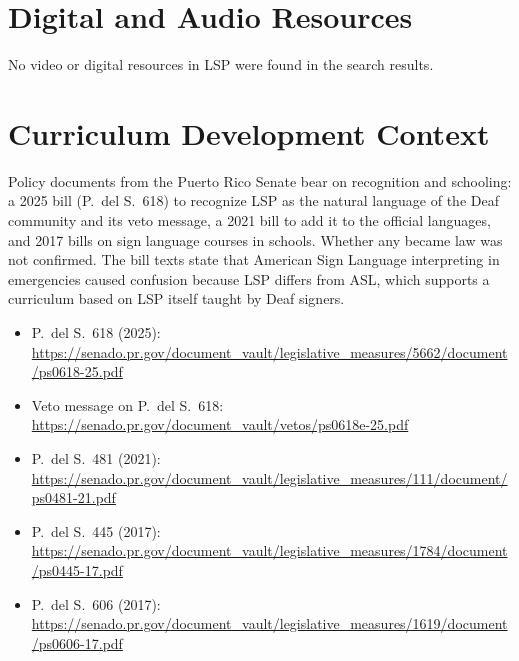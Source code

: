 \documentclass[12pt]{article}
\begin{document}
\section{Digital and Audio Resources}
No video or digital resources in LSP were found in the search results.

\section{Curriculum Development Context}
Policy documents from the Puerto Rico Senate bear on recognition and schooling: a 2025 bill (P.~del S.~618) to recognize LSP as the natural language of the Deaf community and its veto message, a 2021 bill to add it to the official languages, and 2017 bills on sign language courses in schools. Whether any became law was not confirmed. The bill texts state that American Sign Language interpreting in emergencies caused confusion because LSP differs from ASL, which supports a curriculum based on LSP itself taught by Deaf signers.
\begin{itemize}
\item P.~del S.~618 (2025): \url{https://senado.pr.gov/document_vault/legislative_measures/5662/document/ps0618-25.pdf}
\item Veto message on P.~del S.~618: \url{https://senado.pr.gov/document_vault/vetos/ps0618e-25.pdf}
\item P.~del S.~481 (2021): \url{https://senado.pr.gov/document_vault/legislative_measures/111/document/ps0481-21.pdf}
\item P.~del S.~445 (2017): \url{https://senado.pr.gov/document_vault/legislative_measures/1784/document/ps0445-17.pdf}
\item P.~del S.~606 (2017): \url{https://senado.pr.gov/document_vault/legislative_measures/1619/document/ps0606-17.pdf}
\end{itemize}
\end{document}
